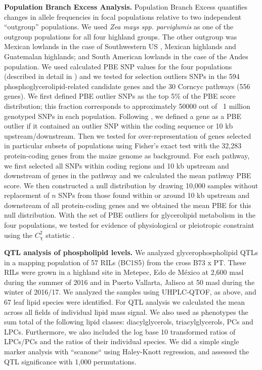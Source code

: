\documentclass[9pt,twocolumn,twoside,lineno]{biorxiv}
\begin{document}
\textbf{Population Branch Excess Analysis.}
Population Branch Excess quantifies changes in allele frequencies in focal populations relative to two independent “outgroup” populations.
We used \textit{Zea mays spp. parviglumis} as one of the outgroup populations for all four highland groups.  
The other outgroup was  Mexican lowlands  in the case of Southwestern US , Mexican highlands and Guatemalan highlands; and South American lowlands in the case of the Andes population. 
We used calculated PBE SNP values for the four populations (described in detail in \cite{Wang2020-mp}) and we tested for selection outliers SNPs in the 594 phosphoglycerolipid-related candidate genes and the 30 Corncyc pathways (556 genes).
We first defined PBE outlier SNPs as the top 5\% of the PBE score distribution; this fraction corresponds to approximately 50000 out of ~1 million genotyped SNPs in each population. 
Following \cite{Wang2020-mp}, we defined a gene as a PBE outlier if it contained an outlier SNP within the coding sequence or 10 kb upstream/downstream. 
Then we tested for over-representation of genes selected in particular subsets of populations using Fisher's exact test with the 32,283 protein-coding genes from the maize genome as background. 
For each pathway, we first selected all SNPs within coding regions and 10 kb upstream and downstream of genes in the pathway and we calculated the mean pathway PBE score. 
We then constructed a null distribution by drawing 10,000 samples without replacement of $n$ SNPs from those found within or around 10 kb upstream and downstream of all protein-coding genes and we obtained the mean PBE for this null distribution. 
With the set of PBE outliers for glycerolipid metabolism in the four populations, we tested for evidence of physiological or pleiotropic constraint using the $C_\chi^2$ statistic \cite{yeaman2018}. 

\textbf{QTL analysis of phospholipid levels.}
We analyzed glycerophospholipid QTLs in a mapping population of 57 RILs (BC1S5) from the cross B73 x PT.
These RILs were grown in a highland site in Metepec, Edo de México at 2,600 masl during the summer of 2016 and in Puerto Vallarta, Jalisco at 50 masl during the winter of 2016/17. 
We analyzed the samples using UHPLC-QTOF, as above, and 67 leaf lipid species were identified.
For QTL analysis we calculated the mean across all fields of individual lipid mass signal. 
We also used as phenotypes the sum total of the following lipid classes: diacylglycerols, triacylglycerols, PCs and  LPCs.  
Furthermore,  we also included the log base 10 transformed ratios of LPCs/PCs and the ratios of their individual species. 
We did a simple single marker analysis  with ``scanone`` using Haley-Knott  regression, and assessed the QTL significance with 1,000 permutations.
\end{document}
